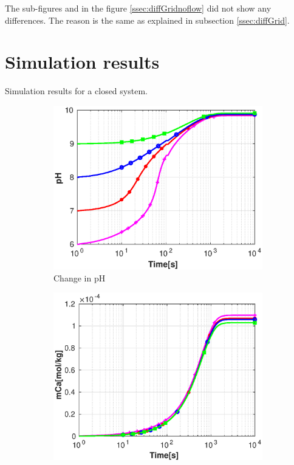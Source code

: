 The sub-figures  and  in the figure \ref{ssec:diffGridnoflow} did not show any differences. 
The reason is the same as explained in subsection \ref{ssec:diffGrid}.

\section{\MATLAB Simulation results}
\MATLAB Simulation results for a closed system. 

\begin{figure}[!h]
        \centering
    \begin{subfigure}{.5\linewidth}
        \centering
        \includegraphics[width=\textwidth]{PICTURES/without_vel_pH.eps}
        \caption{Change in pH}
        \label{fig:withoutvelpH}       %
    \end{subfigure}%
        \hfill
    \begin{subfigure}{.5\linewidth}
        \centering
        \includegraphics[width=\textwidth]{PICTURES/without_vel_mCa.eps}

\end{subfigure}
\end{figure}
